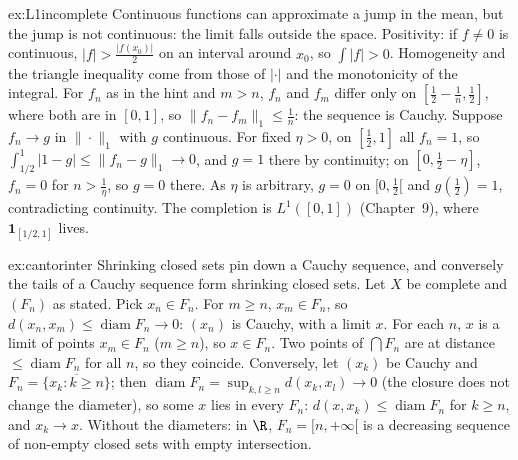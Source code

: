 \begin{solution}{ex:L1incomplete}
\idea Continuous functions can approximate a jump in the mean, but the jump is not continuous: the limit falls outside the space.
\writeup Positivity: if $f\ne0$ is continuous, $|f|>\frac{|f(x_0)|}2$ on an interval around $x_0$, so $\int|f|>0$. Homogeneity and the triangle inequality come from
those of $|\cdot|$ and the monotonicity of the integral. For $f_n$ as in the hint and $m>n$, $f_n$ and $f_m$ differ only on $[\frac12-\frac1n,\frac12]$, where both are in
$[0,1]$, so $\|f_n-f_m\|_1\le\frac1n$: the sequence is Cauchy. Suppose $f_n\to g$ in $\|\cdot\|_1$ with $g$ continuous. For fixed $\eta>0$, on $[\frac12,1]$ all $f_n=1$, so
$\int_{1/2}^1|1-g|\le\|f_n-g\|_1\to0$, and $g=1$ there by continuity; on $[0,\frac12-\eta]$, $f_n=0$ for $n>\frac1\eta$, so $g=0$ there. As $\eta$ is arbitrary, $g=0$ on $[0,\frac12[$ and
$g(\frac12)=1$, contradicting continuity. The completion is $L^1([0,1])$ (Chapter~9), where $\mathbf 1_{[1/2,1]}$ lives.
\end{solution}

\begin{solution}{ex:cantorinter}
\idea Shrinking closed sets pin down a Cauchy sequence, and conversely the tails of a Cauchy sequence form shrinking closed sets.
\writeup Let $X$ be complete and $(F_n)$ as stated. Pick $x_n\in F_n$. For $m\ge n$, $x_m\in F_n$, so $d(x_n,x_m)\le\operatorname{diam}F_n\to0$: $(x_n)$ is Cauchy, with a limit $x$.
For each $n$, $x$ is a limit of points $x_m\in F_n$ ($m\ge n$), so $x\in F_n$. Two points of $\bigcap F_n$ are at distance $\le\operatorname{diam}F_n$ for all $n$, so they
coincide. Conversely, let $(x_k)$ be Cauchy and $F_n=\overline{\{x_k:k\ge n\}}$; then $\operatorname{diam}F_n=\sup_{k,l\ge n}d(x_k,x_l)\to0$ (the closure does not change the
diameter), so some $x$ lies in every $F_n$: $d(x,x_k)\le\operatorname{diam}F_n$ for $k\ge n$, and $x_k\to x$. Without the diameters: in $\R$, $F_n=[n,+\infty[$ is a
decreasing sequence of non-empty closed sets with empty intersection.
\end{solution}

